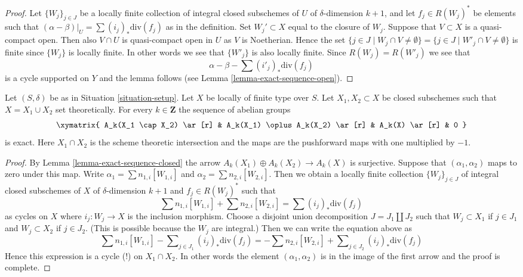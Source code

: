 \begin{proof}
Let $\{W_j\}_{j \in J}$ be a locally finite collection of integral closed
subschemes of $U$ of $\delta$-dimension $k + 1$, and let $f_j \in R(W_j)^*$
be elements such that $(\alpha - \beta)|_U = \sum (i_j)_*\text{div}(f_j)$
as in the definition. Set $W_j' \subset X$ equal
to the closure of $W_j$. Suppose that $V \subset X$ is a quasi-compact
open. Then also $V \cap U$ is quasi-compact open in $U$ as
$V$ is Noetherian. Hence the set
$\{j \in J \mid W_j \cap V \not = \emptyset\}
= \{j \in J \mid W'_j \cap V \not = \emptyset\}$
is finite since $\{W_j\}$ is locally finite. In other words we see that
$\{W'_j\}$ is also locally finite. Since $R(W_j) = R(W'_j)$ we see
that
$$
\alpha - \beta - \sum (i'_j)_*\text{div}(f_j)
$$
is a cycle supported on $Y$ and the lemma follows (see
Lemma \ref{lemma-exact-sequence-open}).
\end{proof}

\begin{lemma}
\label{lemma-exact-sequence-closed-chow}
Let $(S, \delta)$ be as in Situation \ref{situation-setup}.
Let $X$ be locally of finite type over $S$. Let $X_1, X_2 \subset X$
be closed subschemes such that $X = X_1 \cup X_2$ set theoretically.
For every $k \in \mathbf{Z}$ the sequence of abelian groups
$$
\xymatrix{
A_k(X_1 \cap X_2) \ar[r] &
A_k(X_1) \oplus A_k(X_2) \ar[r] &
A_k(X) \ar[r] &
0
}
$$
is exact. Here $X_1 \cap X_2$ is the scheme theoretic intersection and the
maps are the pushforward maps with one multiplied by $-1$.
\end{lemma}

\begin{proof}
By Lemma \ref{lemma-exact-sequence-closed} the arrow
$A_k(X_1) \oplus A_k(X_2) \to A_k(X)$ is surjective.
Suppose that $(\alpha_1, \alpha_2)$ maps to zero under this map.
Write $\alpha_1 = \sum n_{1, i}[W_{1, i}]$ and
$\alpha_2 = \sum n_{2, i}[W_{2, i}]$. Then we obtain a locally
finite collection $\{W_j\}_{j \in J}$ of integral closed
subschemes of $X$ of $\delta$-dimension $k + 1$ and $f_j \in R(W_j)^*$
such that
$$
\sum n_{1, i}[W_{1, i}] + \sum n_{2, i}[W_{2, i}] = \sum (i_j)_*\text{div}(f_j)
$$
as cycles on $X$ where $i_j : W_j \to X$ is the inclusion morphism.
Choose a disjoint union decomposition $J = J_1 \amalg J_2$ such that
$W_j \subset X_1$ if $j \in J_1$ and $W_j \subset X_2$ if $j \in J_2$.
(This is possible because the $W_j$ are integral.) Then we can write
the equation above as
$$
\sum n_{1, i}[W_{1, i}] - \sum\nolimits_{j \in J_1} (i_j)_*\text{div}(f_j) =
- \sum n_{2, i}[W_{2, i}] + \sum\nolimits_{j \in J_2} (i_j)_*\text{div}(f_j)
$$
Hence this expression is a cycle (!) on $X_1 \cap X_2$. In other words
the element $(\alpha_1, \alpha_2)$ is in the image of the first arrow
and the proof is complete.
\end{proof}

